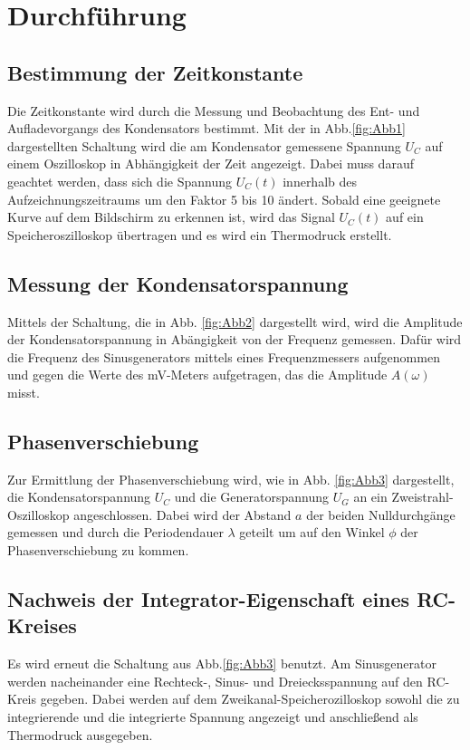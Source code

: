 \section{Durchführung}
\label{sec:Durchführung}

\subsection{Bestimmung der Zeitkonstante}

Die Zeitkonstante wird durch die Messung und Beobachtung des Ent- und Aufladevorgangs des Kondensators bestimmt. 
Mit der in Abb.\ref{fig:Abb1} dargestellten Schaltung wird die am Kondensator gemessene Spannung $U_{C}$ auf einem Oszilloskop in Abhängigkeit der Zeit angezeigt. 
Dabei muss darauf geachtet werden, dass sich die Spannung $U_{C}(t)$ innerhalb des Aufzeichnungszeitraums um den Faktor 5 bis 10 ändert. 
Sobald eine geeignete Kurve auf dem Bildschirm zu erkennen ist, wird das Signal $U_{C}(t)$ auf ein Speicheroszilloskop übertragen und es wird ein Thermodruck erstellt. 

\subsection{Messung der Kondensatorspannung}

Mittels der Schaltung, die in Abb. \ref{fig:Abb2} dargestellt wird, wird die Amplitude der Kondensatorspannung in Abängigkeit von der Frequenz gemessen. Dafür wird die Frequenz des Sinusgenerators mittels eines Frequenzmessers aufgenommen und gegen die Werte des \si{\milli\volt}-Meters aufgetragen, das die Amplitude $A(\omega)$ misst.

\subsection{Phasenverschiebung}

Zur Ermittlung der Phasenverschiebung wird, wie in Abb. \ref{fig:Abb3} dargestellt, die Kondensatorspannung $U_{C}$ und die Generatorspannung $U_{G}$ an ein Zweistrahl-Oszilloskop angeschlossen. 
Dabei wird der Abstand $a$ der beiden Nulldurchgänge gemessen und durch die Periodendauer $\lambda$ geteilt um auf den Winkel $\phi$ der Phasenverschiebung zu kommen. %

\subsection{Nachweis der Integrator-Eigenschaft eines RC-Kreises}

Es wird erneut die Schaltung aus Abb.\ref{fig:Abb3} benutzt. Am Sinusgenerator werden nacheinander eine Rechteck-, Sinus- und Dreiecksspannung auf den RC-Kreis gegeben. Dabei werden auf dem Zweikanal-Speicherozilloskop sowohl die zu integrierende und die integrierte Spannung angezeigt und anschließend als Thermodruck ausgegeben.   
